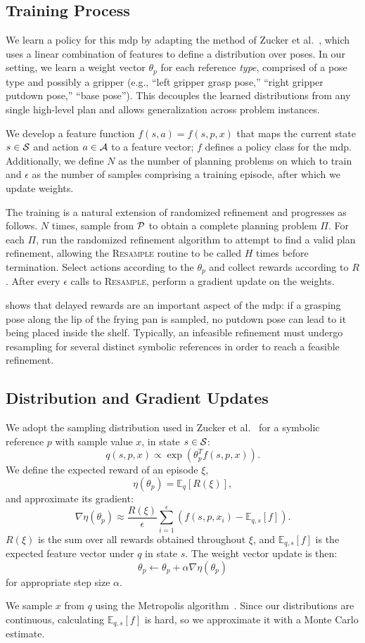 \subsection{Training Process}
We learn a policy for this {\sc mdp} by adapting the method of Zucker et al.~\cite{workspacebias}, which
uses a linear combination of features to define a distribution over poses. In our setting, we learn a weight
vector $\theta_{p}$ for each reference \emph{type}, comprised of a pose type and possibly a gripper
(e.g., ``left gripper grasp pose,'' ``right gripper putdown pose,'' ``base pose'').
This decouples the learned distributions from any single high-level plan and allows generalization across problem instances.

We develop a feature function $f(s, a) = f(s, p, x)$ that maps the current
state $s \in \mathcal{S}$ and action $a \in \mathcal{A}$ to a
feature vector; $f$ defines a policy class for the {\sc mdp}. Additionally, we define
$N$ as the number of planning problems on which to train and
$\epsilon$ as the number of samples comprising a training episode, after which we update weights.

The training is a natural extension of randomized
refinement and progresses as follows. $N$ times, sample from $\mathcal{P}$ to obtain
a complete planning problem $\Pi$. For each $\Pi$, run the randomized refinement
algorithm to attempt to find a valid plan refinement, allowing the \textsc{Resample}
routine to be called $H$ times before termination. Select actions according to the $\theta_{p}$
and collect rewards according to $R$. After every $\epsilon$ calls to
\textsc{Resample}, perform a gradient update on the weights.

 shows that delayed rewards are an important
aspect of the {\sc mdp}: if a grasping pose along the lip of the frying pan is sampled, no putdown pose can lead
to it being placed inside the shelf. Typically, an infeasible refinement must undergo
resampling for several distinct symbolic references in order to reach a feasible refinement.

\subsection{Distribution and Gradient Updates}
We adopt the sampling distribution used in Zucker et al.~\cite{workspacebias}
for a symbolic reference $p$ with sample value $x$, in state $s \in \mathcal{S}$:
$$q(s, p, x) \propto \exp(\theta_{p}^{T} f(s, p, x)).$$
We define the expected reward of an episode $\xi$,
$$\eta(\theta_{p}) = \mathbb{E}_{q}[R(\xi)],$$ and approximate its gradient:
$$\nabla \eta(\theta_{p}) \approx \frac{R(\xi)}{\epsilon} \sum_{i=1}^{\epsilon}(f(s, p, x_{i}) - \mathbb{E}_{q,s}[f]).$$
$R(\xi)$ is the sum over all rewards obtained throughout $\xi$, and
$\mathbb{E}_{q,s}[f]$ is the expected feature vector under $q$ in state $s$. The weight vector update is then:
$$\theta_{p} \leftarrow \theta_{p} + \alpha \nabla \eta(\theta_{p})$$
for appropriate step size $\alpha$.

We sample $x$ from $q$ using the Metropolis algorithm~\cite{chib1995understanding}.
Since our distributions are continuous, calculating $\mathbb{E}_{q,s}[f]$ is hard,
so we approximate it with a Monte Carlo estimate.